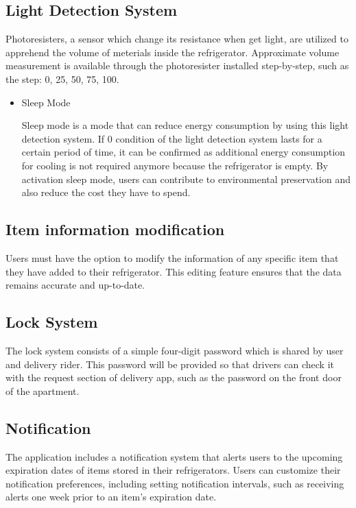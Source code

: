 \documentclass[conference]{IEEEtran}
\begin{document}
\subsection{Light Detection System}
Photoresisters, a sensor which change its resistance when get light, are utilized to apprehend the volume of meterials inside the refrigerator. Approximate volume measurement is available through the photoresister installed step-by-step, such as the step: 0, 25, 50, 75, 100.
\begin{itemize}
    \item Sleep Mode\par
    Sleep mode is a mode that can reduce energy consumption by using this light detection system. If 0 condition of the light detection system lasts for a certain period of time, it can be confirmed as additional energy consumption for cooling is not required anymore because the refrigerator is empty. By activation sleep mode, users can contribute to environmental preservation and also reduce the cost they have to spend.

\end{itemize}


\subsection{Item information modification}
Users must have the option to modify the information of any specific item that they have added to their refrigerator. This editing feature ensures that the data remains accurate and up-to-date.

\subsection{Lock System}
The lock system consists of a simple four-digit password which is shared by user and delivery rider. This password will be provided so that drivers can check it with the request section of delivery app, such as the password on the front door of the apartment.


\subsection{Notification}
The application includes a notification system that alerts users to the upcoming expiration dates of items stored in their refrigerators. Users can customize their notification preferences, including setting notification intervals, such as receiving alerts one week prior to an item's expiration date.
\end{document}
